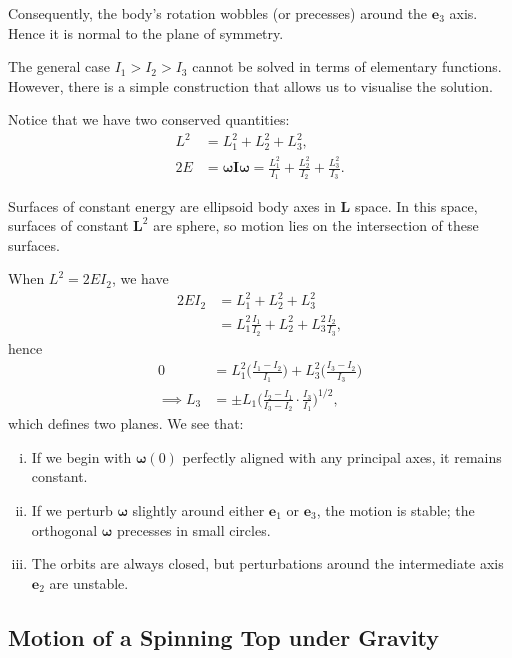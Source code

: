 \documentclass[12pt]{article}
\begin{document}
Consequently, the body's rotation wobbles (or precesses) around the $\mathbf{e}_3$ axis. Hence it is normal to the plane of symmetry.

The general case $I_1 > I_2 > I_3$ cannot be solved in terms of elementary functions. However, there is a simple construction that allows us to visualise the solution.

Notice that we have two conserved quantities:
\begin{align*}
	L^2 &= L_1^2 + L_2^2 + L_3^2,\\
	2E &= \bm{\omega} \mathbf{I} \bm{\omega} = \frac{L_1^2}{I_1} + \frac{L_2^2}{I_2} + \frac{L_3^2}{I_3}.
\end{align*}

Surfaces of constant energy are ellipsoid body axes in $\mathbf{L}$ space. In this space, surfaces of constant $\mathbf{L}^2$ are sphere, so motion lies on the intersection of these surfaces.

When $L^2 = 2 EI_2$, we have
\begin{align*}
	2E I_2 &= L_1^2 + L_2^2 + L_3^2 \\
	       &= L_1^2 \frac{I_1}{I_2} + L_2^2 + L_3^2 \frac{I_2}{I_3},
\end{align*}
hence
\begin{align*}
	0 &= L_1^2 \biggl( \frac{I_1 - I_2}{I_1} \biggr) + L_3^2 \biggl( \frac{I_3 - I_2}{I_3} \biggr) \\
	\implies  L_3 &= \pm L_1 \biggl( \frac{I_2 - I_1}{I_3 - I_2} \cdot \frac{I_3}{I_1} \biggr)^{1/2},
\end{align*}
which defines two planes. We see that:
\begin{enumerate}[(i)]
	\item If we begin with $\bm{\omega}(0)$ perfectly aligned with any principal axes, it remains constant.
	\item If we perturb $\bm{\omega}$ slightly around either $\mathbf{e}_1$ or $\mathbf{e}_3$, the motion is stable; the orthogonal $\bm{\omega}$ precesses in small circles.
	\item The orbits are always closed, but perturbations around the intermediate axis $\mathbf{e}_2$ are unstable.
\end{enumerate}


\subsection{Motion of a Spinning Top under Gravity}
\label{sub:top_gravity}
\end{document}
